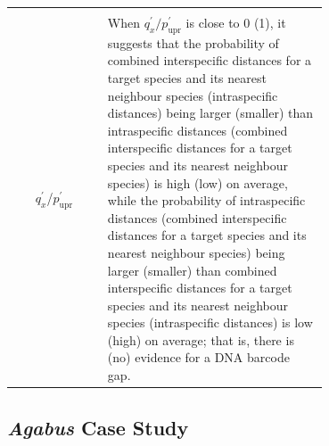 \documentclass[12pt]{article}
\begin{document}
\begin{table}[H]
\begin{tabular}{cp{0.7\linewidth}}
        & \\[-2mm]
     $q^{'}_x$/$p^{'}_{\text{upr}}$ & When $q^{'}_x/p^{'}_{\text{upr}}$ is close to 0 (1), it suggests that the probability of combined interspecific distances for a target species and its nearest neighbour species (intraspecific distances) being larger (smaller) than intraspecific distances (combined interspecific distances for a target species and its nearest neighbour species) is high (low) on average, while the probability of intraspecific distances (combined interspecific distances for a target species and its nearest neighbour species) being larger (smaller) than combined interspecific distances for a target species and its nearest neighbour species (intraspecific distances) is low (high) on average; that is, there is (no) evidence for a DNA barcode gap.\\
    \hline
    \end{tabular}
\end{table}

\subsection{\textit{Agabus} Case Study}
\end{document}
